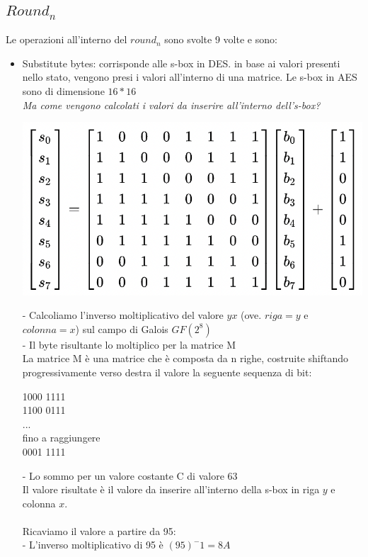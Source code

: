 \documentclass[11pt, oneside]{article}   	%
\begin{document}
\subsection*{$Round_n$}
Le operazioni all'interno del $round_n$ sono svolte 9 volte e sono:
\begin{itemize}
\item Substitute bytes: corrisponde alle s-box in DES. in base ai valori presenti nello stato, vengono presi i valori all'interno di una matrice. Le s-box in AES sono di dimensione $16 * 16$\\
\emph{Ma come vengono calcolati i valori da inserire all'interno dell's-box?}
\begin{center}
\includegraphics[scale= 0.4]{aesbox}
\end{center}
- Calcoliamo l'inverso moltiplicativo del valore $yx$ (ove. $riga = y$ e $colonna = x$) sul campo di Galois $GF(2^8)$\\
- Il byte risultante lo moltiplico per la matrice M\\
La matrice M è una matrice che è composta da n righe, costruite shiftando progressivamente verso destra il valore la seguente sequenza di bit: \begin{center}
1000 1111\\
1100 0111\\
...\\
fino a raggiungere\\
0001 1111
\end{center}
- Lo sommo per un valore costante C di valore 63\\
Il valore risultate è il valore da inserire all'interno della s-box in riga $y$ e colonna $x$.\\\\
Ricaviamo il valore a partire da 95:\\
- L'inverso moltiplicativo di 95  è $({95})^-1 = 8A$ \\

\end{itemize}
\end{document}
